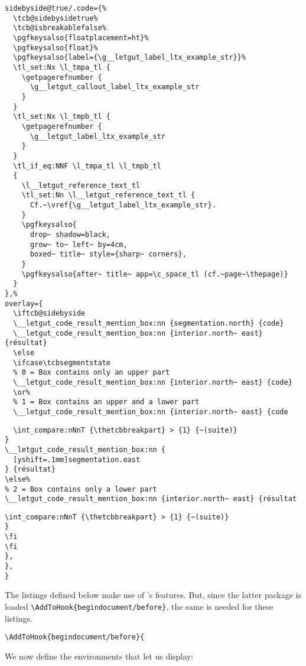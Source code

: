 \documentclass{letgut}
\begin{document}
\begin{lstlisting}
sidebyside@true/.code={%
  \tcb@sidebysidetrue%
  \tcb@isbreakablefalse%
  \pgfkeysalso{floatplacement=ht}%
  \pgfkeysalso{float}%
  \pgfkeysalso{label={\g__letgut_label_ltx_example_str}}%
  \tl_set:Nx \l_tmpa_tl {
    \getpagerefnumber {
      \g__letgut_callout_label_ltx_example_str
    }
  }
  \tl_set:Nx \l_tmpb_tl {
    \getpagerefnumber {
      \g__letgut_label_ltx_example_str
    }
  }
  \tl_if_eq:NNF \l_tmpa_tl \l_tmpb_tl
  {
    \l__letgut_reference_text_tl
    \tl_set:Nn \l__letgut_reference_text_tl {
      Cf.~\vref{\g__letgut_label_ltx_example_str}.
    }
    \pgfkeysalso{
      drop~ shadow=black,
      grow~ to~ left~ by=4cm,
      boxed~ title~ style={sharp~ corners},
    }
    \pgfkeysalso{after~ title~ app=\c_space_tl (cf.~page~\thepage)}
  }
},%
overlay={
  \iftcb@sidebyside
  \__letgut_code_result_mention_box:nn {segmentation.north} {code}
  \__letgut_code_result_mention_box:nn {interior.north~ east} {résultat}
  \else
  \ifcase\tcbsegmentstate
  % 0 = Box contains only an upper part
  \__letgut_code_result_mention_box:nn {interior.north~ east} {code}
  \or%
  % 1 = Box contains an upper and a lower part
  \__letgut_code_result_mention_box:nn {interior.north~ east} {code
\end{lstlisting}

\begin{lstlisting}
  \int_compare:nNnT {\thetcbbreakpart} > {1} {~(suite)}
}
\__letgut_code_result_mention_box:nn {
  [yshift=.1mm]segmentation.east
} {résultat}
\else%
% 2 = Box contains only a lower part
\__letgut_code_result_mention_box:nn {interior.north~ east} {résultat
\end{lstlisting}

\begin{lstlisting}
\int_compare:nNnT {\thetcbbreakpart} > {1} {~(suite)}
}
\fi
\fi
},
},
}
\end{lstlisting}

The  listings defined below make use of
's features. But, since the latter package is loaded
\lstinline+\AddToHook{begindocument/before}+, the same is needed for these listings.

\begin{lstlisting}
\AddToHook{begindocument/before}{
\end{lstlisting}

We now define the environments that let us display:
\end{document}
